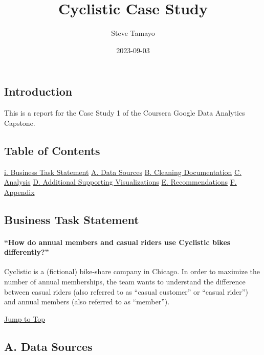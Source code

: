 \documentclass[
]{article}
\title{Cyclistic Case Study}
\author{Steve Tamayo}
\date{2023-09-03}
\begin{document}
\maketitle

\hypertarget{introduction}{%
\subsection{Introduction}\label{introduction}}

This is a report for the Case Study 1 of the Coursera Google Data
Analytics Capstone.

\hypertarget{table-of-contents}{%
\subsection{Table of Contents}\label{table-of-contents}}

\protect\hyperlink{pti}{i. Business Task Statement}
\protect\hyperlink{ptA}{A. Data Sources} \protect\hyperlink{ptB}{B.
Cleaning Documentation} \protect\hyperlink{ptC}{C. Analysis}
\protect\hyperlink{ptD}{D. Additional Supporting Visualizations}
\protect\hyperlink{ptE}{E. Recommendations} \protect\hyperlink{ptF}{F.
Appendix}

\hypertarget{business-task-statement}{%
\subsection{Business Task Statement}\label{business-task-statement}}

\hypertarget{how-do-annual-members-and-casual-riders-use-cyclistic-bikes-differently}{%
\paragraph{``How do annual members and casual riders use Cyclistic bikes
differently?''}\label{how-do-annual-members-and-casual-riders-use-cyclistic-bikes-differently}}

Cyclistic is a (fictional) bike-share company in Chicago. In order to
maximize the number of annual memberships, the team wants to understand
the difference between casual riders (also referred to as ``casual
customer'' or ``casual rider'') and annual members (also referred to as
``member'').

\protect\hyperlink{toc}{Jump to Top}

\hypertarget{a.-data-sources}{%
\subsection{A. Data Sources}\label{a.-data-sources}}
\end{document}
